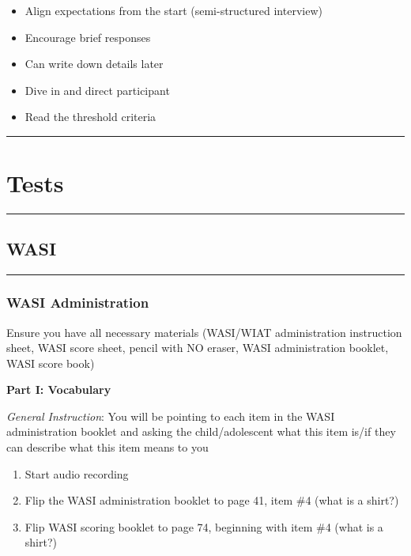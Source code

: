 \documentclass[]{book}
\providecommand{\tightlist}{%
  \setlength{\itemsep}{0pt}\setlength{\parskip}{0pt}}
\begin{document}
\begin{itemize}
\tightlist
\item
  Align expectations from the start (semi-structured interview)
\item
  Encourage brief responses
\item
  Can write down details later
\item
  Dive in and direct participant
\item
  Read the threshold criteria
\end{itemize}

\begin{center}\rule{0.5\linewidth}{0.5pt}\end{center}

\section{Tests}\label{tests}

\begin{center}\rule{0.5\linewidth}{0.5pt}\end{center}

\subsection{WASI}\label{wasi}

\begin{center}\rule{0.5\linewidth}{0.5pt}\end{center}

\subsubsection{WASI Administration}\label{wasi-administration}

Ensure you have all necessary materials (WASI/WIAT administration
instruction sheet, WASI score sheet, pencil with NO eraser, WASI
administration booklet, WASI score book)

\textbf{Part I: Vocabulary}

\emph{General Instruction}: You will be pointing to each item in the
WASI administration booklet and asking the child/adolescent what this
item is/if they can describe what this item means to you

\begin{enumerate}
\def\labelenumi{\arabic{enumi}.}
\tightlist
\item
  Start audio recording
\item
  Flip the WASI administration booklet to page 41, item \#4 (what is a
  shirt?)
\item
  Flip WASI scoring booklet to page 74, beginning with item \#4 (what is
  a shirt?)
\end{enumerate}
\end{document}
